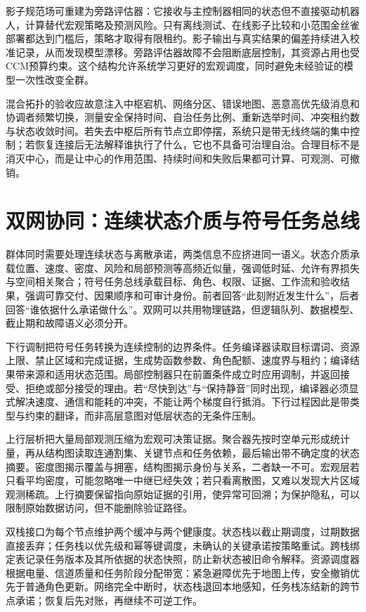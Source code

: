 影子规范场可重建为旁路评估器：它接收与主控制器相同的状态但不直接驱动机器人，计算替代宏观策略及预测风险。只有离线测试、在线影子比较和小范围金丝雀部署都达到门槛后，策略才取得有限租约。影子输出与真实结果的偏差持续进入校准记录，从而发现模型漂移。旁路评估器故障不会阻断底层控制，其资源占用也受CCM预算约束。这个结构允许系统学习更好的宏观调度，同时避免未经验证的模型一次性改变全群。

混合拓扑的验收应故意注入中枢宕机、网络分区、错误地图、恶意高优先级消息和协调者频繁切换，测量安全保持时间、自治任务比例、重新选举时间、冲突租约数与状态收敛时间。若失去中枢后所有节点立即停摆，系统只是带无线终端的集中控制；若恢复连接后无法解释谁执行了什么，它也不具备可治理自治。合理目标不是消灭中心，而是让中心的作用范围、持续时间和失败后果都可计算、可观测、可撤销。

\section{双网协同：连续状态介质与符号任务总线}
\label{sec:dual_network_synergy}

群体同时需要处理连续状态与离散承诺，两类信息不应挤进同一语义。状态介质承载位置、速度、密度、风险和局部预测等高频近似量，强调低时延、允许有界损失与空间相关聚合；符号任务总线承载目标、角色、权限、证据、工作流和验收结果，强调可靠交付、因果顺序和可审计身份。前者回答“此刻附近发生什么”，后者回答“谁依据什么承诺做什么”。双网可以共用物理链路，但逻辑队列、数据模型、截止期和故障语义必须分开。

下行调制把符号任务转换为连续控制的边界条件。任务编译器读取目标谓词、资源上限、禁止区域和完成证据，生成势函数参数、角色配额、速度界与租约；编译结果带来源和适用状态范围。局部控制器只在前置条件成立时应用调制，并返回接受、拒绝或部分接受的理由。若“尽快到达”与“保持静音”同时出现，编译器必须显式解决速度、通信和能耗的冲突，不能让两个梯度自行抵消。下行过程因此是带类型与约束的翻译，而非高层意图对低层状态的无条件压制。

上行层析把大量局部观测压缩为宏观可决策证据。聚合器先按时空单元形成统计量，再从结构图读取连通割集、关键节点和任务依赖，最后输出带不确定度的状态摘要。密度图揭示覆盖与拥塞，结构图揭示身份与关系，二者缺一不可。宏观层若只看平均密度，可能忽略唯一中继已经失效；若只看离散图，又难以发现大片区域观测稀疏。上行摘要保留指向原始证据的引用，使异常可回溯；为保护隐私，可以限制原始数据访问，但不能删除验证路径。

双栈接口为每个节点维护两个缓冲与两个健康度。状态栈以截止期调度，过期数据直接丢弃；任务栈以优先级和幂等键调度，未确认的关键承诺按策略重试。跨栈绑定表记录任务版本及其所依据的状态快照，防止新状态被旧命令解释。资源调度器根据电量、信道质量和任务阶段分配带宽：紧急避障优先于地图上传，安全撤销优先于普通角色更新。网络完全中断时，状态栈退回本地感知，任务栈冻结新的跨节点承诺；恢复后先对账，再继续不可逆工作。

